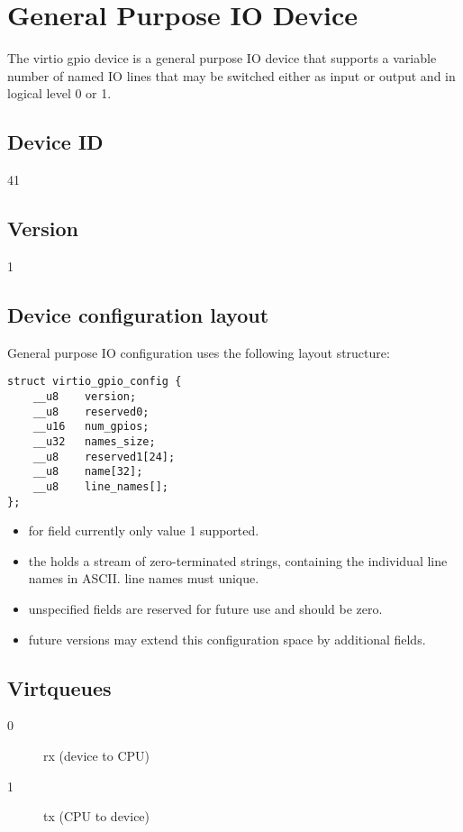 \section{General Purpose IO Device}\label{sec:Device Types / General Purpose IO}

The virtio gpio device is a general purpose IO device that supports a variable
number of named IO lines that may be switched either as input or output and
in logical level 0 or 1.

\subsection{Device ID}\label{sec:Device Types / General Purpose IO / Device ID}
  41

\subsection{Version}\label{sec:Device Types / General Purpose IO / Version}
  1

\subsection{Device configuration layout}\label{sec:Device Types / General Purpose IO / Device configuration layout}

General purpose IO configuration uses the following layout structure:

\begin{lstlisting}
struct virtio_gpio_config {
    __u8    version;
    __u8    reserved0;
    __u16   num_gpios;
    __u32   names_size;
    __u8    reserved1[24];
    __u8    name[32];
    __u8    line_names[];
};
\end{lstlisting}

\begin{itemize}
    \item for  field currently only value 1 supported.
    \item the  holds a stream of zero-terminated strings,
        containing the individual line names in ASCII. line names must unique.
    \item unspecified fields are reserved for future use and should be zero.
    \item future versions may extend this configuration space by additional fields.
\end{itemize}

\subsection{Virtqueues}\label{sec:Device Types / General Purpose IO / Virtqueues}
\begin{description}
\item[0] rx (device to CPU)
\item[1] tx (CPU to device)
\end{description}

